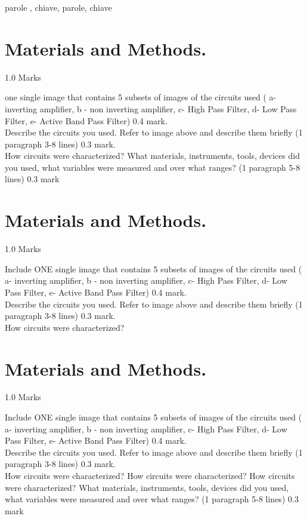 \documentclass[journal]{IEEEtran}
\begin{document}
\begin{IEEEkeywords}
parole , chiave, parole, chiave
\end{IEEEkeywords}

\section{Materials and Methods. }
\begin{flushright} 1.0 Marks \end{flushright}
 one single image that contains 5 subsets of images of the circuits used ( a- inverting amplifier, b - non inverting amplifier, c- High Pass Filter, d- Low Pass Filter, e- Active Band Pass Filter) 0.4 mark.\\[0.1in]
Describe the circuits you used. Refer to image above and describe them briefly (1 paragraph 3-8 lines) 0.3 mark.\\[0.1in]
How circuits were characterized?  What materials, instruments, tools, devices did you used, what variables were measured and over what ranges? (1 paragraph 5-8 lines) 0.3 mark\\

\section{Materials and Methods. }
\begin{flushright} 1.0 Marks \end{flushright}
Include ONE single image that contains 5 subsets of images of the circuits used ( a- inverting amplifier, b - non inverting amplifier, c- High Pass Filter, d- Low Pass Filter, e- Active Band Pass Filter) 0.4 mark.\\[0.1in]
Describe the circuits you used. Refer to image above and describe them briefly (1 paragraph 3-8 lines) 0.3 mark.\\[0.1in]
How circuits were characterized?




\section{Materials and Methods. }
\begin{flushright} 1.0 Marks \end{flushright}
Include ONE single image that contains 5 subsets of images of the circuits used ( a- inverting amplifier, b - non inverting amplifier, c- High Pass Filter, d- Low Pass Filter, e- Active Band Pass Filter) 0.4 mark.\\[0.1in]
Describe the circuits you used. Refer to image above and describe them briefly (1 paragraph 3-8 lines) 0.3 mark.\\[0.1in]
How circuits were characterized? How circuits were characterized? How circuits were characterized? What materials, instruments, tools, devices did you used, what variables were measured and over what ranges? (1 paragraph 5-8 lines) 0.3 mark\\
\end{document}
